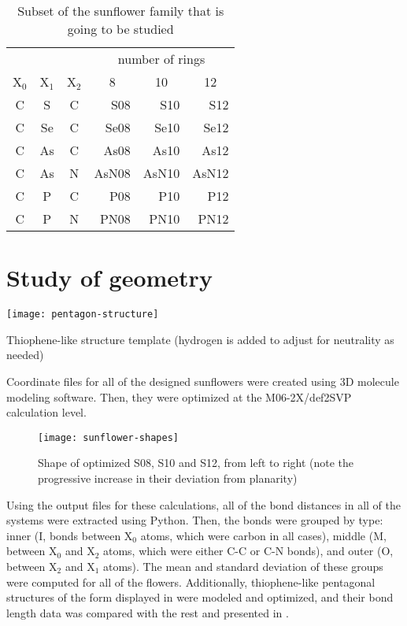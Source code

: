 \begin{table}
    \centering
    \caption[Sunflowers in this study]{Subset of the sunflower family that is going to be studied}
    \begin{tabular}{@{}cccrrr@{}}
        \toprule
        &&& \multicolumn{3}{c}{number of rings} \\
        X$_0$ & X$_1$ & X$_2$ & \multicolumn{1}{c}{8} & \multicolumn{1}{c}{10} & \multicolumn{1}{c}{12} \\
        \midrule
        C & S & C & S08 & S10 & S12 \\
        C & Se & C & Se08 & Se10 & Se12 \\
        C & As & C & As08 & As10 & As12 \\
        C & As & N & AsN08 & AsN10 & AsN12 \\
        C & P & C & P08 & P10 & P12 \\
        C & P & N & PN08 & PN10 & PN12 \\
        \bottomrule
    \end{tabular}
\end{table}


\section{Study of geometry}

\begin{marginfigure}
    \texttt{[image: pentagon-structure]}
    \caption[Thiophene-like structure template]{Thiophene-like structure template (hydrogen is added to adjust for neutrality as needed)}
\end{marginfigure}

Coordinate files for all of the designed sunflowers were created using 3D molecule modeling software.
Then, they were optimized at the M06-2X/def2SVP calculation level.

\begin{figure}
    \texttt{[image: sunflower-shapes]}
    \caption[Shape of the sunflowers]{Shape of optimized S08, S10 and S12, from left to right (note the progressive increase in their deviation from planarity)}
\end{figure}

Using the output files for these calculations, all of the bond distances in all of the systems were extracted using Python.
Then, the bonds were grouped by type: inner (I, bonds between X$_0$ atoms, which were carbon in all cases), middle (M, between X$_0$ and X$_2$ atoms, which were either C-C or C-N bonds), and outer (O, between X$_2$ and X$_1$ atoms).
The mean and standard deviation of these groups were computed for all of the flowers.
Additionally, thiophene-like pentagonal structures of the form displayed in  were modeled and optimized, and their bond length data was compared with the rest and presented in .

